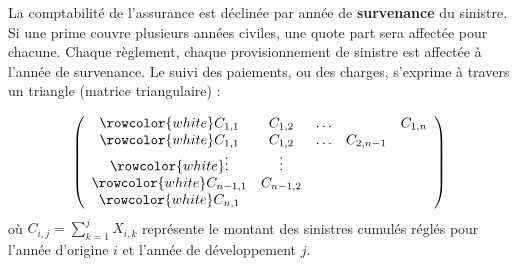 \begin{f}
	
	La comptabilité de l'assurance est déclinée par année de \textbf{survenance} du sinistre. 
	Si une prime couvre plusieurs années civiles, une quote part sera affectée pour chacune.
	Chaque règlement, chaque provisionnement de sinistre est affectée à l'année de survenance. 
	Le suivi des paiements, ou des charges, s'exprime à travers  un triangle (matrice triangulaire) :
	
	\[
	\left(\begin{array}{ccccc}
		\rowcolor{white}	C_{1,1} & C_{1,2} & \ldots & & C_{1, n} \\
		\rowcolor{white}	C_{1,1} & C_{1,2} & \ldots & C_{2, n-1} \\
		\rowcolor{white}	\vdots & \vdots & & \\
		\rowcolor{white}	C_{n-1,1} & C_{n-1,2} & & \\
		\rowcolor{white}	C_{n, 1} & & &
	\end{array}\right)
	\]
	où \(C_{i, j}=\sum_{k=1}^{j} X_{i, k}\) représente le montant des sinistres cumulés  réglés pour l'année d'origine \(i\) et l'année de développement \(j\).
	
\end{f}


